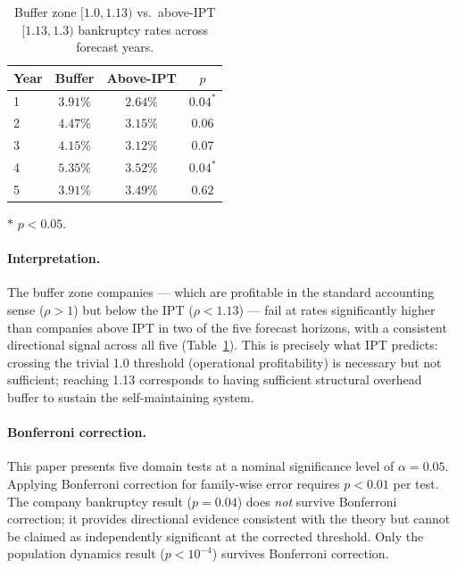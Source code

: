 \documentclass[11pt,twocolumn]{article}
\theoremstyle{remark}
\begin{document}
\begin{table}[ht]
\centering
\caption{Buffer zone $[1.0, 1.13)$ vs.\ above-IPT $[1.13, 1.3)$ bankruptcy rates across forecast years.}
\label{tab:econ_zones_allyears}
\begin{tabular}{@{}lccc@{}}
\toprule
Year & Buffer & Above-IPT & $p$ \\
\midrule
1 & $3.91\%$ & $2.64\%$ & $0.04^*$ \\
2 & $4.47\%$ & $3.15\%$ & $0.06$   \\
3 & $4.15\%$ & $3.12\%$ & $0.07$   \\
4 & $5.35\%$ & $3.52\%$ & $0.04^*$ \\
5 & $3.91\%$ & $3.49\%$ & $0.62$   \\
\bottomrule
\end{tabular}
{\small $*$ $p < 0.05$.}
\end{table}

\paragraph{Interpretation.}
The buffer zone companies --- which are profitable in the standard accounting sense ($\rho > 1$) but below the IPT ($\rho < 1.13$) --- fail at rates significantly higher than companies above IPT in two of the five forecast horizons, with a consistent directional signal across all five (Table~\ref{tab:econ_zones_allyears}). This is precisely what IPT predicts: crossing the trivial 1.0 threshold (operational profitability) is necessary but not sufficient; reaching 1.13 corresponds to having sufficient structural overhead buffer to sustain the self-maintaining system.

\paragraph{Bonferroni correction.}
This paper presents five domain tests at a nominal significance level of $\alpha = 0.05$. Applying Bonferroni correction for family-wise error requires $p < 0.01$ per test. The company bankruptcy result ($p = 0.04$) does \emph{not} survive Bonferroni correction; it provides directional evidence consistent with the theory but cannot be claimed as independently significant at the corrected threshold. Only the population dynamics result ($p < 10^{-4}$) survives Bonferroni correction.
\end{document}
